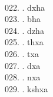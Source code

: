 \begin{tabbing}
\filler\tibsp{}\tenrm\ \tibetan
\egroup  \\
022. .	\> dxha	\> \bgroup\tibetan \def\u#1{\vtop{\baselineskip0pt\hbox{#1}\hbox{\tibsp\char123}}}\parindent=0pt \newbox\fillerbox\setbox\fillerbox\hbox{\vrule height0.4cm depth0.4cm width0pt}\def\filler{\copy\fillerbox}\tibsp{}\tibetan%
\filler\tibsp{}\tenrm\ \tibetan
\egroup  \\
023. .	\> bha	\> \bgroup\tibetan \def\u#1{\vtop{\baselineskip0pt\hbox{#1}\hbox{\tibsp\char123}}}\parindent=0pt \newbox\fillerbox\setbox\fillerbox\hbox{\vrule height0.4cm depth0.4cm width0pt}\def\filler{\copy\fillerbox}\tibsp{}\tibetan%
\filler\tibsp{}\tenrm\ \tibetan
\egroup  \\
024. .	\> dzha	\> \bgroup\tibetan \def\u#1{\vtop{\baselineskip0pt\hbox{#1}\hbox{\tibsp\char123}}}\parindent=0pt \newbox\fillerbox\setbox\fillerbox\hbox{\vrule height0.4cm depth0.4cm width0pt}\def\filler{\copy\fillerbox}\tibsp{}\tibetan%
\filler\tibsp{}\tenrm\ \tibetan
\egroup  \\
025. .	\> thxa	\> \bgroup\tibetan \def\u#1{\vtop{\baselineskip0pt\hbox{#1}\hbox{\tibsp\char123}}}\parindent=0pt \newbox\fillerbox\setbox\fillerbox\hbox{\vrule height0.4cm depth0.4cm width0pt}\def\filler{\copy\fillerbox}\tibsp{}\tibetan%
\filler\tibsp{}\tenrm\ \tibetan
\egroup  \\
026. .	\> txa	\> \bgroup\tibetan \def\u#1{\vtop{\baselineskip0pt\hbox{#1}\hbox{\tibsp\char123}}}\parindent=0pt \newbox\fillerbox\setbox\fillerbox\hbox{\vrule height0.4cm depth0.4cm width0pt}\def\filler{\copy\fillerbox}\tibsp{}\tibetan%
\filler\tibsp{}\tenrm\ \tibetan
\egroup  \\
027. .	\> dxa	\> \bgroup\tibetan \def\u#1{\vtop{\baselineskip0pt\hbox{#1}\hbox{\tibsp\char123}}}\parindent=0pt \newbox\fillerbox\setbox\fillerbox\hbox{\vrule height0.4cm depth0.4cm width0pt}\def\filler{\copy\fillerbox}\tibsp{}\tibetan%
\filler\tibsp{}\tenrm\ \tibetan
\egroup  \\
028. .	\> nxa	\> \bgroup\tibetan \def\u#1{\vtop{\baselineskip0pt\hbox{#1}\hbox{\tibsp\char123}}}\parindent=0pt \newbox\fillerbox\setbox\fillerbox\hbox{\vrule height0.4cm depth0.4cm width0pt}\def\filler{\copy\fillerbox}\tibsp{}\tibetan%
\filler\tibsp{}\tenrm\ \tibetan
\egroup  \\
029. .	\> kshxa \> \bgroup\tibetan \def\u#1{\vtop{\baselineskip0pt\hbox{#1}\hbox{\tibsp\char123}}}\parindent=0pt \newbox\fillerbox\setbox\fillerbox\hbox{\vrule height0.4cm depth0.4cm width0pt}\def\filler{\copy\fillerbox}\tibsp{}\tibetan%

\end{tabbing}
